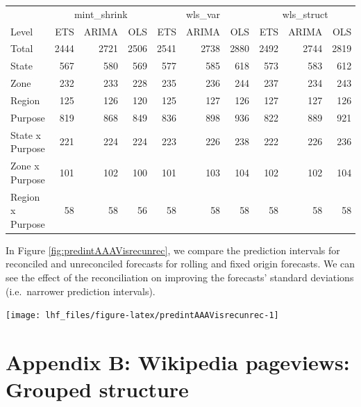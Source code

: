\documentclass[11pt,a4paper,]{article}
\let\origfigure\figure
\let\endorigfigure\endfigure
\renewenvironment{figure}[1][2] {
    \expandafter\origfigure\expandafter[!htbp]
} {
    \endorigfigure
}
\let\origtable\table
\let\endorigtable\endtable
\renewenvironment{table}[1][2] {
    \expandafter\origtable\expandafter[!htbp]
} {
    \endorigtable
}
\begin{document}
\begin{table}

\caption{\label{tab:Tourismdatadifrecfix}Comparing Mean(RMSE) of three   different reconciliation matrices for fixed origin forecasts on a 24 months test set.}
\centering
\begin{tabular}[t]{lrrrrrrrrr}
\toprule
\multicolumn{1}{c}{} & \multicolumn{3}{c}{mint\_shrink} & \multicolumn{3}{c}{wls\_var} & \multicolumn{3}{c}{wls\_struct} \\
\cmidrule(l{3pt}r{3pt}){2-4} \cmidrule(l{3pt}r{3pt}){5-7} \cmidrule(l{3pt}r{3pt}){8-10}
Level & ETS & ARIMA & OLS & ETS & ARIMA & OLS & ETS & ARIMA & OLS\\
\midrule
Total & 2444 & 2721 & 2506 & 2541 & 2738 & 2880 & 2492 & 2744 & 2819\\
State & 567 & 580 & 569 & 577 & 585 & 618 & 573 & 583 & 612\\
Zone & 232 & 233 & 228 & 235 & 236 & 244 & 237 & 234 & 243\\
Region & 125 & 126 & 120 & 125 & 127 & 126 & 127 & 127 & 126\\
Purpose & 819 & 868 & 849 & 836 & 898 & 936 & 822 & 889 & 921\\
State x Purpose & 221 & 224 & 224 & 223 & 226 & 238 & 222 & 226 & 236\\
Zone x Purpose & 101 & 102 & 100 & 101 & 103 & 104 & 102 & 102 & 104\\
Region x Purpose & 58 & 58 & 56 & 58 & 58 & 58 & 58 & 58 & 58\\
\bottomrule
\end{tabular}
\end{table}

In Figure \ref{fig:predintAAAVisrecunrec}, we compare the prediction intervals for reconciled and unreconciled forecasts for rolling and fixed origin forecasts. We can see the effect of the reconciliation on improving the forecasts' standard deviations (i.e.~narrower prediction intervals).

\begin{figure}

{\centering \texttt{[image: lhf\_files/figure-latex/predintAAAVisrecunrec-1]} 

}

\caption{Comparing forecasts and prediction intervals of 'AAAVis' bottom-level series across methods. Left: rolling origin. Right: fixed origin.}\label{fig:predintAAAVisrecunrec}
\end{figure}

\hypertarget{appendix-b-wikipedia-pageviews-grouped-structure}{%
\section{Appendix B: Wikipedia pageviews: Grouped structure}\label{appendix-b-wikipedia-pageviews-grouped-structure}}
\end{document}
